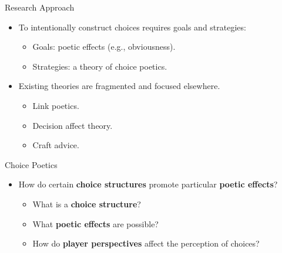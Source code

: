 \documentclass[xcolor=x11names]{beamer}
\begin{document}
\begin{frame}{Research Approach}
  \begin{itemize}\addtolength{\itemsep}{0.5\baselineskip}
    \item To intentionally construct choices requires goals and strategies:%
    \begin{itemize}\addtolength{\itemsep}{0.5\baselineskip}
      \vspace{0.5\baselineskip}
      \item Goals: poetic effects (e.g., obviousness).
      \item Strategies: a theory of choice poetics.
    \end{itemize}
    \item Existing theories are fragmented and focused elsewhere.
    \begin{itemize}\addtolength{\itemsep}{0.5\baselineskip}
      \vspace{0.5\baselineskip}
      \item Link poetics.
      \item Decision affect theory.
      \item Craft advice.
    \end{itemize}
  \end{itemize}
\end{frame}

\begin{frame}{Choice Poetics}
  \begin{itemize}\addtolength{\itemsep}{0.5\baselineskip}
      \item How do certain \textbf{choice structures} promote particular \textbf{poetic effects}?
    \begin{itemize}\addtolength{\itemsep}{0.5\baselineskip}
      \vspace{0.5\baselineskip}
      \item What is a \textbf{choice structure}?
      \item What \textbf{poetic effects} are possible?
      \item How do \textbf{player perspectives} affect the perception of choices?
    \end{itemize}
  \end{itemize}
\end{frame}
\end{document}
